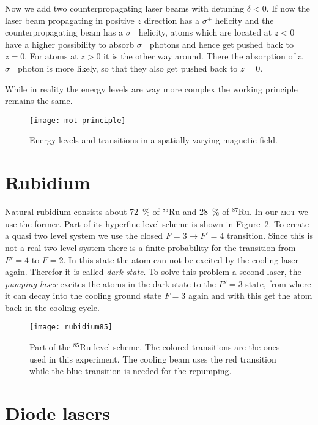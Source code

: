\documentclass[11pt, english, fleqn, DIV=15, headinclude, BCOR=2cm]{scrreprt}
\newcommand\mot{\textsc{mot}}
\begin{document}
Now we add two counterpropagating laser beams with detuning $\delta<0$. If now
the laser beam propagating in positive $z$ direction has a $\sigma^+$ helicity
and the counterpropagating beam has a $\sigma^-$ helicity, atoms which are
located at $z<0$ have a higher possibility to absorb $\sigma^+$ photons and
hence get pushed back to $z=0$. For atoms at $z>0$ it is the other way around.
There the absorption of a $\sigma^-$ photon is more likely, so that they 
also get pushed back to $z=0$.

While in reality the energy levels are way more complex the working principle
remains the same.

\begin{figure}
    \centering
    \texttt{[image: mot-principle]}
    \caption{%
        Energy levels and transitions in a spatially varying magnetic field.
    }
    \label{fig:mot-principle}
\end{figure}

\section{Rubidium}

Natural rubidium consists about \SI{72}{\percent} of ${}^{85}\text{Ru}$ and
\SI{28}{\percent} of ${}^{87}\text{Ru}$. In our \mot{} we use the former.
Part of its hyperfine level scheme is shown in Figure~\ref{fig:rubidium85}. To
create a quasi two level system we use the closed $F=3 \to F'=4$ transition.
Since this is not a real two level system there is a finite probability for the
transition from $F'=4$ to $F=2$. In this state the atom can not be excited by
the cooling laser again. Therefor it is called \emph{dark state}. To solve this
problem a second laser, the \emph{pumping laser} excites the atoms in the dark
state to the $F'=3$ state, from where it can decay into the cooling ground
state $F=3$ again and with this get the atom back in the cooling cycle.

\begin{figure}
    \centering
    \texttt{[image: rubidium85]}
    \caption{%
        Part of the ${}^{85}\text{Ru}$ level scheme. The colored transitions
        are the ones used in this experiment. The cooling beam uses the red
        transition while the blue transition is needed for the repumping.
    }
    \label{fig:rubidium85}
\end{figure}

\section{Diode lasers}
\end{document}
